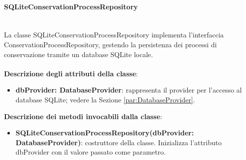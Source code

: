 \documentclass[a4paper,12pt]{article}
\begin{document}
{{{                \paragraph{SQLiteConservationProcessRepository}\label{par:SQLiteConservationProcessRepository}\mbox{}\\
                La classe SQLiteConservationProcessRepository implementa l'interfaccia ConservationProcessRepository, gestendo la persistenza dei processi di conservazione tramite un database SQLite locale.\\
                \\
                \textbf{Descrizione degli attributi della classe}:
                \begin{itemize}
                    \item \textbf{dbProvider: DatabaseProvider}: rappresenta il provider per l'accesso al database SQLite; vedere la Sezione \ref{par:DatabaseProvider}.
                \end{itemize}
 
              \noindent \textbf{Descrizione dei metodi invocabili dalla classe}:
                \begin{itemize}
                    \item \textbf{SQLiteConservationProcessRepository(dbProvider: DatabaseProvider)}: costruttore della classe. Inizializza l'attributo dbProvider con il valore passato come parametro.
                \end{itemize}

}}}
\end{document}
